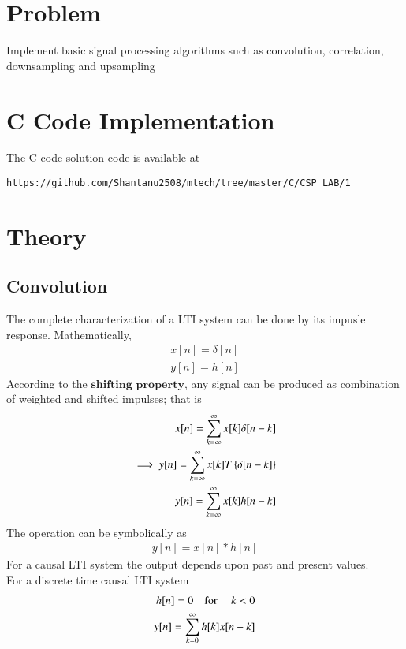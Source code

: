 \documentclass[journal,12pt,twocolumn]{IEEEtran}
\begin{document}
\section{Problem}
Implement basic signal processing algorithms such as convolution, correlation, downsampling and upsampling 
\section{C Code Implementation}
The C code solution code is available at
\begin{lstlisting}
https://github.com/Shantanu2508/mtech/tree/master/C/CSP_LAB/1
\end{lstlisting}
%
\section{Theory}
\subsection{Convolution}
The complete characterization of a LTI system can be done by its impusle response. Mathematically,
\begin{align*}
	x[n]=\delta[n] \\ 
	y[n]=h[n]
\end{align*}
According to the $\mathbf{shifting}$ $\mathbf{property}$, any signal can be produced as combination of weighted and shifted impulses; that is
\begin{align*}
	x[n]=\sum\limits_{k=\infty}^{\infty} x[k]\delta[n-k] \\
	\implies 
	y[n]=\sum\limits_{k=\infty}^{\infty} x[k] T\left\{\delta[n-k]\right\} \\
	y[n]=\sum\limits_{k=\infty}^{\infty} x[k] h[n-k] \\
\end{align*}
The operation can be symbolically as 
\begin{align*}
	y[n]=x[n]*h[n]
\end{align*}
For a causal LTI system the output depends upon past and present values. \\
For a discrete time causal LTI system 
\begin{align*}
	h[n]=0 \text{\quad for \quad} k<0 \\
	y[n]=\sum\limits_{k=0}^{\infty} h[k] x[n-k] \\
\end{align*}
\end{document}
